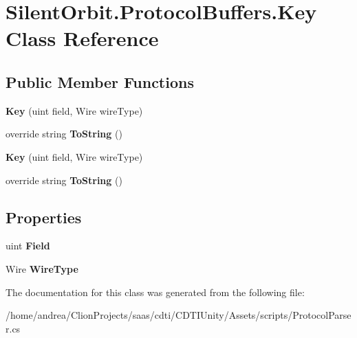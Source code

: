 \hypertarget{class_silent_orbit_1_1_protocol_buffers_1_1_key}{}\section{Silent\+Orbit.\+Protocol\+Buffers.\+Key Class Reference}
\label{class_silent_orbit_1_1_protocol_buffers_1_1_key}
\subsection*{Public Member Functions}
\begin{DoxyCompactItemize}
\item 
{\bfseries Key} (uint field, Wire wire\+Type)\hypertarget{class_silent_orbit_1_1_protocol_buffers_1_1_key_afec25f3e95b45ea1637725a855e81360}{}\label{class_silent_orbit_1_1_protocol_buffers_1_1_key_afec25f3e95b45ea1637725a855e81360}

\item 
override string {\bfseries To\+String} ()\hypertarget{class_silent_orbit_1_1_protocol_buffers_1_1_key_ae46395a4028f035c19a07caa680f1ad0}{}\label{class_silent_orbit_1_1_protocol_buffers_1_1_key_ae46395a4028f035c19a07caa680f1ad0}

\item 
{\bfseries Key} (uint field, Wire wire\+Type)\hypertarget{class_silent_orbit_1_1_protocol_buffers_1_1_key_afec25f3e95b45ea1637725a855e81360}{}\label{class_silent_orbit_1_1_protocol_buffers_1_1_key_afec25f3e95b45ea1637725a855e81360}

\item 
override string {\bfseries To\+String} ()\hypertarget{class_silent_orbit_1_1_protocol_buffers_1_1_key_ae46395a4028f035c19a07caa680f1ad0}{}\label{class_silent_orbit_1_1_protocol_buffers_1_1_key_ae46395a4028f035c19a07caa680f1ad0}

\end{DoxyCompactItemize}
\subsection*{Properties}
\begin{DoxyCompactItemize}
\item 
uint {\bfseries Field}\hypertarget{class_silent_orbit_1_1_protocol_buffers_1_1_key_a633f5ab095f7ed07ae3767d719834747}{}\label{class_silent_orbit_1_1_protocol_buffers_1_1_key_a633f5ab095f7ed07ae3767d719834747}

\item 
Wire {\bfseries Wire\+Type}\hypertarget{class_silent_orbit_1_1_protocol_buffers_1_1_key_a0080c3bd74cda7b92d7066cdeb25f819}{}\label{class_silent_orbit_1_1_protocol_buffers_1_1_key_a0080c3bd74cda7b92d7066cdeb25f819}

\end{DoxyCompactItemize}


The documentation for this class was generated from the following file\+:\begin{DoxyCompactItemize}
\item 
/home/andrea/\+Clion\+Projects/saas/cdti/\+C\+D\+T\+I\+Unity/\+Assets/scripts/Protocol\+Parser.\+cs\end{DoxyCompactItemize}
